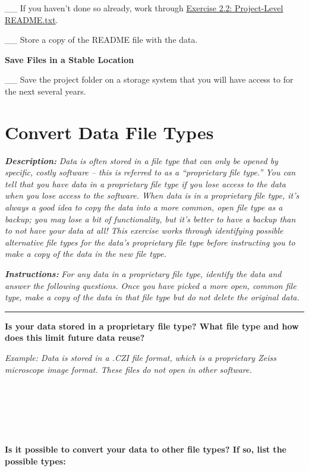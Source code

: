 \documentclass[
]{book}
\begin{document}
\_\_ If you haven't done so already, work through \protect\hyperlink{readme-txt}{Exercise 2.2: Project-Level README.txt}.

\_\_ Store a copy of the README file with the data.

\textbf{Save Files in a Stable Location}

\_\_ Save the project folder on a storage system that you will have access to for the next several years.

\hypertarget{file-type}{%
\section{Convert Data File Types}\label{file-type}}

\textbf{\emph{Description:}} \emph{Data is often stored in a file type that can only be opened by specific, costly software -- this is referred to as a ``proprietary file type.'' You can tell that you have data in a proprietary file type if you lose access to the data when you lose access to the software. When data is in a proprietary file type, it's always a good idea to copy the data into a more common, open file type as a backup; you may lose a bit of functionality, but it's better to have a backup than to not have your data at all! This exercise works through identifying possible alternative file types for the data's proprietary file type before instructing you to make a copy of the data in the new file type.}

\textbf{\emph{Instructions:}} \emph{For any data in a proprietary file type, identify the data and answer the following questions. Once you have picked a more open, common file type, make a copy of the data in that file type but do not delete the original data.}

\begin{center}\rule{0.5\linewidth}{0.5pt}\end{center}

\textbf{Is your data stored in a proprietary file type? What file type and how does this limit future data reuse?}

\emph{Example: Data is stored in a .CZI file format, which is a proprietary Zeiss microscope image format. These files do not open in other software.}

~

~

~

\textbf{Is it possible to convert your data to other file types? If so, list the possible types:}
\end{document}
